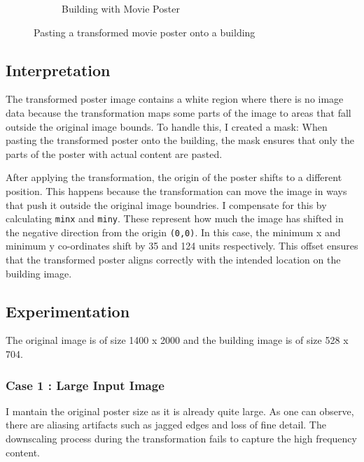 \documentclass{article}
\begin{document}
\begin{figure}[H]
\begin{subfigure}{.3\textwidth}
        \caption{Building with Movie Poster}  
        \label{fig 2}
    \end{subfigure}
    \caption{Pasting a transformed movie poster onto a building}
\end{figure}

\subsection{Interpretation}
The transformed poster image contains a white region where there is no image data because the transformation maps some parts of the image
to areas that fall outside the original image bounds. To handle this, I created a mask: When pasting the transformed poster onto the building, 
the mask ensures that only the parts of the poster with actual content are pasted.

After applying the transformation, the origin of the poster shifts to a different position. This happens because the transformation can move the 
image in ways that push it outside the original image boundries. I compensate for this by calculating \texttt{minx} and \texttt{miny}. These
represent how much the image has shifted in the negative direction from the origin \texttt{(0,0)}. In this case, the minimum x and minimum y co-ordinates
shift by 35 and 124 units respectively. This offset ensures that the transformed poster aligns correctly with the intended location on the building image.


\subsection{Experimentation}
The original image is of size 1400 x 2000 and the building image is of size 528 x 704. 
\subsubsection{Case 1 : Large Input Image}
I mantain the original poster size as it is already quite large. As one can observe, there are aliasing artifacts such as jagged edges and loss of fine detail. The downscaling process during the transformation 
fails to capture the high frequency content. 
\end{document}
